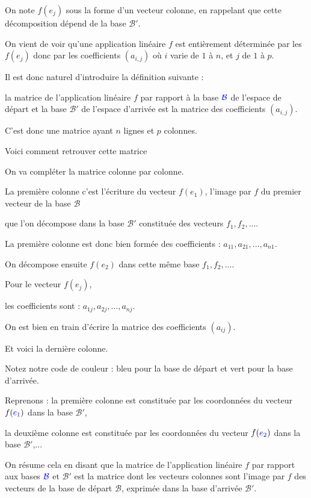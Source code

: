 \change
On note $f(e_j)$ sous la forme d'un vecteur colonne, en rappelant que cette décomposition
dépend de la base $\mathcal{B}'$.

\diapo

On vient de voir qu'une application linéaire $f$ est entièrement déterminée par 
les $f(e_j)$ donc par 
les coefficients $(a_{i,j})$ où $i$ varie de $1$ à $n$, et $j$ de $1$ à $p$.

\change
Il est donc
naturel d'introduire la définition suivante : 

la matrice de l'application linéaire $f$ par
rapport à la base  ${\color{blue}\mathcal{B}}$ de l'espace de départ 
et la base $\mathcal{B}'$ de l'espace d'arrivée est la matrice des coefficients $(a_{i,j})$.

C'est donc une matrice ayant $n$ lignes et $p$ colonnes.

\change
Voici comment retrouver cette matrice

On va compléter la matrice colonne par colonne.

\change
La première colonne c'est l'écriture du vecteur $f(e_1)$,
l'image par $f$ du premier vecteur de la base $\mathcal{B}$

\change
que l'on décompose dans la base $\mathcal{B}'$ constituée des vecteurs $f_1,f_2,...$.

\change
La première colonne est donc bien formée des coefficients :
$a_{11}, a_{21},..., a_{n1}$.

On décompose ensuite $f(e_2)$ dans cette même base $f_1,f_2,...$.

\change
Pour le vecteur $f(e_j)$, 

\change
les coefficients sont :  
$a_{1j}, a_{2j}, ..., a_{nj}$.

On est bien en train d'écrire la matrice des coefficients $(a_{ij})$.

\change
Et voici la dernière colonne.

Notez notre code de couleur : bleu pour la base de départ et vert pour la base d'arrivée.

\change
Reprenons : la première colonne est constituée par les coordonnées du vecteur
$f({\color{blue}e_1})$ dans la base $\mathcal{B}'$,

la deuxième colonne est constituée par les coordonnées du vecteur
$f({\color{blue}e_2})$ dans la base $\mathcal{B}'$,...

\change
On résume cela en disant que la matrice de l'application linéaire $f$ par
rapport aux bases ${\color{blue}\mathcal{B}}$ et $\mathcal{B}'$ est la matrice dont les vecteurs colonnes 
sont l'image par $f$ des vecteurs de la base de départ $\mathcal{B}$, 
exprimée dans la base d'arrivée $\mathcal{B}'$.


